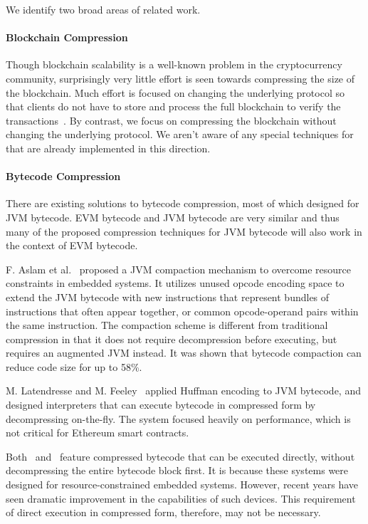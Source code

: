 We identify two broad areas of related work.

\paragraph{Blockchain Compression}
Though blockchain scalability is a well-known problem in the cryptocurrency community,
surprisingly very little effort is seen towards compressing the size of the blockchain.
Much effort is focused on changing the underlying protocol so that clients
do not have to store and process the full blockchain to verify the transactions~\cite{lightclient, ultimate}.
By contrast, we focus on compressing the blockchain without changing the underlying protocol.
We aren't aware of any special techniques for that are already implemented in this direction.


\paragraph{Bytecode Compression}
There are existing solutions to bytecode compression, most of which designed for JVM bytecode.
EVM bytecode and JVM bytecode are very similar and thus many of the proposed compression techniques for JVM bytecode
will also work in the context of EVM bytecode.

F. Aslam et al.~\cite{aslam2010} proposed a JVM compaction mechanism to overcome resource constraints in embedded systems.
It utilizes unused opcode encoding space to extend the JVM bytecode with new instructions that represent bundles of
instructions that often appear together, or common opcode-operand pairs within the same instruction.
The compaction scheme is different from traditional compression in that it does not require decompression before executing,
but requires an augmented JVM instead. It was shown that bytecode compaction can reduce code size for up to 58\%.

M. Latendresse and M. Feeley~\cite{marc2003} applied Huffman encoding to JVM bytecode, and designed interpreters that
can execute bytecode in compressed form by decompressing on-the-fly.
The system focused heavily on performance, which is not critical for Ethereum smart contracts.

Both~\cite{aslam2010} and~\cite{marc2003} feature compressed bytecode that can be executed directly, without decompressing
the entire bytecode block first. It is because these systems were designed for resource-constrained embedded systems.
However, recent years have seen dramatic improvement in the capabilities of such devices.
This requirement of direct execution in compressed form, therefore, may not be necessary.

